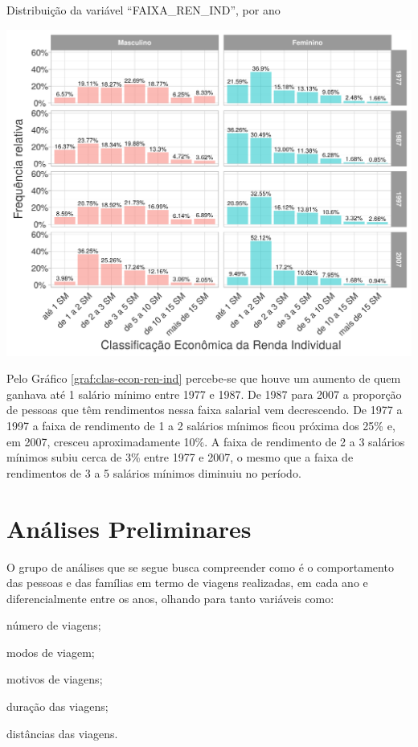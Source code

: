 \begin{grafico}[htb]%
    \caption{\label{graf:clas-econ-ren-ind}Distribuição da variável ``FAIXA_REN_IND'', por ano}%
        \begin{center}%
        \includegraphics[width=1\textwidth]{./imagens/clas-econ-ren-ind.png}%
    \end{center}%
\end{grafico}%

Pelo Gráfico \ref{graf:clas-econ-ren-ind} percebe-se que houve um aumento de quem ganhava até 1 salário mínimo entre 1977 e 1987. De 1987 para 2007 a proporção de pessoas que têm rendimentos nessa faixa salarial vem decrescendo. De 1977 a 1997 a faixa de rendimento de 1 a 2 salários mínimos ficou próxima dos 25\% e, em 2007, cresceu aproximadamente 10\%. A faixa de rendimento de 2 a 3 salários mínimos subiu cerca de 3\% entre 1977 e 2007, o mesmo que a faixa de rendimentos de 3 a 5 salários mínimos diminuiu no período.


\clearpage

\section{Análises Preliminares}\label{sec:analises-preliminares}

O grupo de análises que se segue busca compreender como é o comportamento das pessoas e das famílias em termo de viagens realizadas, em cada ano e diferencialmente entre os anos, olhando para tanto variáveis como:
\begin{compactitem}
\item número de viagens;
\item modos de viagem;
\item motivos de viagens;
\item duração das viagens;
\item distâncias das viagens.
\end{compactitem}

